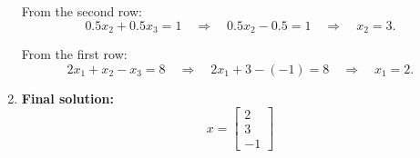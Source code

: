\documentclass[../../../main.tex]{subfiles}
\begin{document}
\begin{enumerate}
          From the second row:
          \begin{equation*}
              0.5x_2 + 0.5x_3 = 1 \quad \Rightarrow \quad 0.5x_2 - 0.5 = 1 \quad \Rightarrow \quad x_2 = 3.
          \end{equation*}

          From the first row:
          \begin{equation*}
              2x_1 + x_2 - x_3 = 8 \quad \Rightarrow \quad 2x_1 + 3 - (-1) = 8 \quad \Rightarrow \quad x_1 = 2.
          \end{equation*}
    \item \textbf{Final solution:}
          \begin{equation*}
              x =
              \begin{bmatrix}
                  2 \\ 3 \\ -1
              \end{bmatrix}
          \end{equation*}
\end{enumerate}
\end{document}
